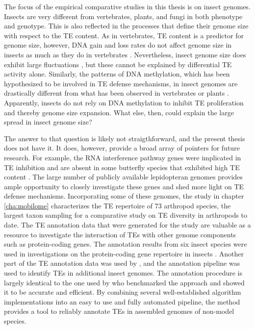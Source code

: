 The focus of the empirical comparative studies in this thesis is on
insect genomes. Insects are very different from vertebrates, plants,
and fungi in both phenotype and genotype. This is also reflected in the
processes that define their genome size with respect to the TE content.
As in vertebrates, TE content is a predictor for genome size, however,
DNA gain and loss rates do not affect genome size in insects as much as
they do in vertebrates \citep{Kapusta2017a, Lindblad-Toh2005}.
Nevertheless, insect genome size does exhibit large fluctuations
\citep{Alfsnes2017}, but these cannot be explained by differential TE
activity alone.  Similarly, the patterns of DNA methylation, which has
been hypothesized to be involved in TE defense mechanisms, in insect
genomes are drastically different from what has been observed in
vertebrates or plants \citep{Provataris2018, Suzuki2008}. Apparently,
insects do not rely on DNA methylation to inhibit TE proliferation and
thereby genome size expansion. What else, then, could explain the large
spread in insect genome size?

The answer to that question is likely not straigthforward, and the
present thesis does not have it. It does, however, provide a broad array
of pointers for future research. For example, the RNA interference
pathway genes were implicated in TE inhibition \citep{Aravin2001,
Czech2008} and are absent in some butterfly species that exhibited high
TE content \citep{Dowling2017}. The large number of publicly available
lepidopteran genomes provides ample opportunity to closely investigate
these genes and shed more light on TE defense mechanisms. Incorporating
some of these genomes, the study in chapter \ref{cha:mobilome}
characterizes the TE repertoire of 73 arthropod species, the largest
taxon sampling for a comparative study on TE diversity in arthropods to
date. The TE annotation data that were generated for the study are
valuable as a resource to investigate the interaction of TEs with other
genome components such as protein-coding genes. The annotation results
from six insect species  were used in
investigations on the protein-coding gene repertoire in insects
. Another part of the TE annotation data was
used by \citep{Provataris2018}, and the annotation pipeline was used to
identify TEs in additional insect genomes. The annotation procedure is
largely identical to the one used by \citet{Reinar2016} who benchmarked
the approach and showed it to be accurate and efficient. By combining
several well-established algorithm implementations into an easy to use
and fully automated pipeline, the method provides a tool to reliably
annotate TEs in assembled genomes of non-model species. 

